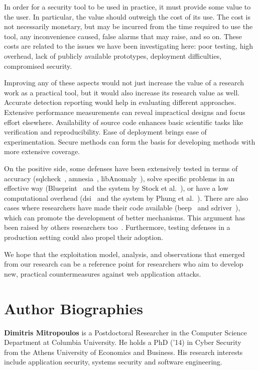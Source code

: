 \documentclass[10pt,journal,compsoc]{IEEEtran}
\begin{document}
In order for a security tool to be used in practice, it must provide
some value to the user. In particular, the value should outweigh the
cost of its use. The cost is not necessarily monetary, but may be
incurred from the time required to use the tool, any inconvenience
caused, false alarms that may raise, and so on. These costs are related to the
issues we have been investigating here: poor testing, high overhead,
lack of publicly available prototypes,
deployment difficulties, compromised security. 

Improving any of these aspects would not just increase the value of a 
research work as a practical tool, but it would also increase its
research value as well.
Accurate detection reporting would help in evaluating different
approaches. Extensive performance measurements can reveal impractical
designs and focus effort elsewhere. Availability of source code
enhances basic scientific tasks like verification and reproducibility. Ease of
deployment brings ease of experimentation. Secure methods can form the
basis for developing methods with more extensive coverage.

On the positive side, some defenses have been extensively tested in
terms of accuracy ({\sc sqlc}heck~\cite{SW06},
{\sc amnesia}~\cite{HO05b}, libAnomaly~\cite{VMV05}),
solve specific problems in an effective way
(Blueprint~\cite{LV09} and the system by Stock et al.~\cite{SLMS14}),
or have a low computational overhead
({\sc dsi}~\cite{NSS06} and the system by Phung et al.~\cite{PSC09}).
There are also cases where
researchers have made their code available ({\sc beep}~\cite{TNH07}
and {\sc sd}river~\cite{MS09}),
which can promote the development of better
mechanisms. This argument has been raised by others
researchers too~\cite{SPWS13}.
Furthermore, testing defenses in a production
setting could also propel their adoption.

We hope that the exploitation model, analysis, and observations that
emerged from our research can be a reference point for researchers who
aim to develop new, practical countermeasures against web application
attacks.

\vspace{-4mm}



\vspace{-0.5mm}

\section*{Author Biographies}
\vspace{-0.5mm}
\noindent
{\bf Dimitris Mitropoulos} is a Postdoctoral Researcher
in the Computer Science Department
at Columbia University.
He holds a PhD ('14) in Cyber Security from the
Athens University of Economics and Business.
His research interests include application security,
systems security and software engineering.
\end{document}
